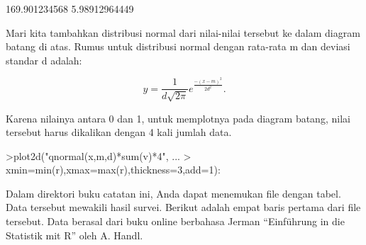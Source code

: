 \documentclass[a4paper,10pt]{article}
\begin{document}
\begin{eulernotebook}
\begin{eulercomment}
\begin{eulercomment}
\begin{eulercomment}
\begin{eulercomment}
\begin{eulercomment}
\begin{eulercomment}
\begin{eulercomment}
\begin{eulercomment}
\begin{eulercomment}
\begin{eulercomment}
\begin{eulercomment}
\begin{eulercomment}
\begin{eulercomment}
\begin{eulercomment}
\begin{eulercomment}
\begin{eulercomment}
\begin{eulercomment}
\begin{eulercomment}
\begin{eulercomment}
\begin{eulercomment}
\begin{eulercomment}
\begin{eulercomment}
\begin{eulercomment}
\begin{eulercomment}
\begin{eulercomment}
\begin{eulercomment}
\begin{eulercomment}
\begin{eulercomment}
\begin{eulercomment}
\begin{eulercomment}
\begin{eulercomment}
\begin{eulercomment}
\begin{eulercomment}
\begin{eulercomment}
\begin{eulercomment}
\begin{eulercomment}
\begin{eulercomment}
\begin{eulercomment}
\begin{eulercomment}
\begin{eulercomment}
\begin{eulercomment}
\begin{eulercomment}
\begin{eulercomment}
\begin{eulercomment}
\begin{euleroutput}
  169.901234568
  5.98912964449
\end{euleroutput}
\begin{eulercomment}
Mari kita tambahkan distribusi normal dari nilai-nilai tersebut ke
dalam diagram batang di atas. Rumus untuk distribusi normal dengan
rata-rata m dan deviasi standar d adalah:

\end{eulercomment}
\begin{eulerformula}
\[
y=\frac{1}{d\sqrt{2\pi}}e^{\frac{-(x-m)^2}{2d^2}}.
\]
\end{eulerformula}
\begin{eulercomment}
Karena nilainya antara 0 dan 1, untuk memplotnya pada diagram batang,
nilai tersebut harus dikalikan dengan 4 kali jumlah data.
\end{eulercomment}
\begin{eulerprompt}
>plot2d("qnormal(x,m,d)*sum(v)*4", ...
>  xmin=min(r),xmax=max(r),thickness=3,add=1):
\end{eulerprompt}
\begin{eulercomment}
Dalam direktori buku catatan ini, Anda dapat menemukan file dengan
tabel. Data tersebut mewakili hasil survei. Berikut adalah empat baris
pertama dari file tersebut. Data berasal dari buku online berbahasa
Jerman “Einführung in die Statistik mit R” oleh A. Handl.
\end{eulercomment}

\end{eulercomment}
\end{eulercomment}
\end{eulercomment}
\end{eulercomment}
\end{eulercomment}
\end{eulercomment}
\end{eulercomment}
\end{eulercomment}
\end{eulercomment}
\end{eulercomment}
\end{eulercomment}
\end{eulercomment}
\end{eulercomment}
\end{eulercomment}
\end{eulercomment}
\end{eulercomment}
\end{eulercomment}
\end{eulercomment}
\end{eulercomment}
\end{eulercomment}
\end{eulercomment}
\end{eulercomment}
\end{eulercomment}
\end{eulercomment}
\end{eulercomment}
\end{eulercomment}
\end{eulercomment}
\end{eulercomment}
\end{eulercomment}
\end{eulercomment}
\end{eulercomment}
\end{eulercomment}
\end{eulercomment}
\end{eulercomment}
\end{eulercomment}
\end{eulercomment}
\end{eulercomment}
\end{eulercomment}
\end{eulercomment}
\end{eulercomment}
\end{eulercomment}
\end{eulercomment}
\end{eulercomment}
\end{eulercomment}
\end{eulernotebook}
\end{document}
